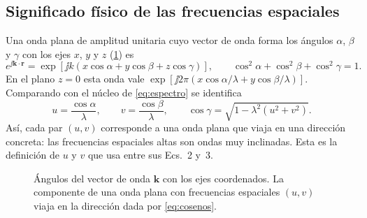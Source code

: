 \subsection{Significado físico de las frecuencias espaciales}

Una onda plana de amplitud unitaria cuyo vector de onda forma los ángulos $\alpha$, $\beta$
y $\gamma$ con los ejes $x$, $y$ y $z$ (\cref{fig:cosenos}) es
\begin{equation}
  e^{\jj\bm k\cdot\bm r}=\exp\!\left[\jj k\left(x\cos\alpha+y\cos\beta+z\cos\gamma\right)\right],
  \qquad \cos^2\alpha+\cos^2\beta+\cos^2\gamma=1 .
  \label{eq:onda-plana}
\end{equation}
En el plano $z=0$ esta onda vale $\exp[\jj2\pi(x\cos\alpha/\lambda+y\cos\beta/\lambda)]$.
Comparando con el núcleo de \eqref{eq:espectro} se identifica
\begin{equation}
  u=\frac{\cos\alpha}{\lambda},\qquad v=\frac{\cos\beta}{\lambda},\qquad
  \cos\gamma=\sqrt{1-\lambda^2\left(u^2+v^2\right)} .
  \label{eq:cosenos}
\end{equation}
Así, cada par $(u,v)$ corresponde a una onda plana que viaja en una dirección concreta: las
frecuencias espaciales altas son ondas muy inclinadas. Esta es la definición de $u$ y $v$
que usa \textcite{chen2021} entre sus Ecs.~2 y~3.

\begin{figure}[htb]
\centering
{}
\caption[Cosenos directores del vector de onda]{Ángulos del vector de onda $\bm k$ con los
ejes coordenados. La componente de una onda plana con frecuencias espaciales $(u,v)$ viaja
en la dirección dada por \cref{eq:cosenos}.}
\label{fig:cosenos}
\end{figure}

